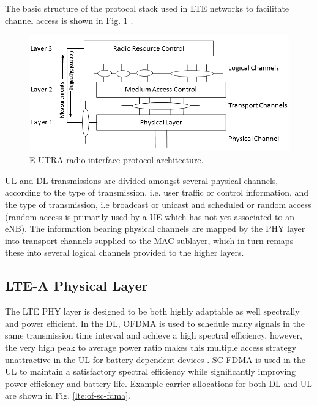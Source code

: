 The basic structure of the protocol stack used in LTE networks to facilitate channel access is shown in Fig. \ref{figs:stack} \cite{tr36201}.
\begin{figure}[!ht]	
	\includegraphics[width=\textwidth]{figures3/LTEradio-interface}
	\caption{E-UTRA radio interface protocol architecture.}
	\label{figs:stack}
\end{figure}
UL and DL transmissions are divided amongst several physical channels, according to the type of transmission, i.e. user traffic or control information, and the type of transmission, i.e broadcast or unicast and scheduled or random access (random access is primarily used by a UE which has not yet associated to an eNB). The information bearing physical channels are mapped by the PHY layer into transport channels supplied to the MAC sublayer, which in turn remaps these into several logical channels provided to the higher layers. 

\subsection{LTE-A Physical Layer}
\label{lte-phy}
The LTE PHY layer is designed to be both highly adaptable as well spectrally and power efficient.  In the DL, OFDMA is used to schedule many signals in the same transmission time interval and achieve a high spectral efficiency, however, the very high peak to average power ratio makes this multiple access strategy unattractive in the UL for battery dependent devices \cite{tr36201}\cite{tr36211}.  SC-FDMA is used in the UL to maintain a satisfactory spectral efficiency while significantly improving power efficiency and battery life. Example carrier allocations for both DL and UL are shown in Fig. \ref{lte:of-sc-fdma}.

